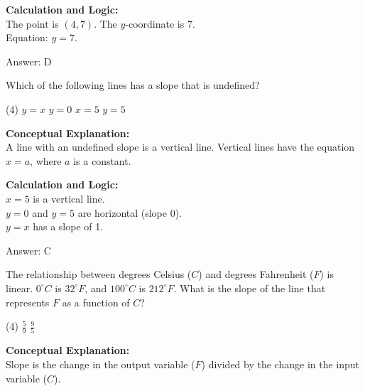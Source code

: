 \documentclass[11pt,paper=a4,answers]{exam}
\begin{document}
\begin{questions}
\begin{solution}
\vspace{10pt}
\textbf{Calculation and Logic:} \\
The point is $(4, 7)$. The $y$-coordinate is 7. \\
Equation: $y = 7$.

\vspace{15pt}
Answer: \colorbox{yellow!100}{D}
\end{solution}

\vspace{20pt}

\question
Which of the following lines has a slope that is undefined?
\begin{tasks}(4)
    \task $y = x$
    \task $y = 0$
    \task $x = 5$
    \task $y = 5$
\end{tasks}

\begin{solution}
\textbf{Conceptual Explanation:} \\
A line with an undefined slope is a vertical line. Vertical lines have the equation $x = a$, where $a$ is a constant.

\vspace{10pt}
\textbf{Calculation and Logic:} \\
$x = 5$ is a vertical line. \\
$y = 0$ and $y = 5$ are horizontal (slope 0). \\
$y = x$ has a slope of 1.

\vspace{15pt}
Answer: \colorbox{yellow!100}{C}
\end{solution}

\vspace{20pt}

\question
The relationship between degrees Celsius ($C$) and degrees Fahrenheit ($F$) is linear. $0^\circ C$ is $32^\circ F$, and $100^\circ C$ is $212^\circ F$. What is the slope of the line that represents $F$ as a function of $C$?
\begin{tasks}(4)
    \task $\frac{5}{9}$
    \task $\frac{9}{5}$
\end{tasks}

\begin{solution}
\textbf{Conceptual Explanation:} \\
Slope is the change in the output variable ($F$) divided by the change in the input variable ($C$).


\end{solution}
\end{questions}
\end{document}
